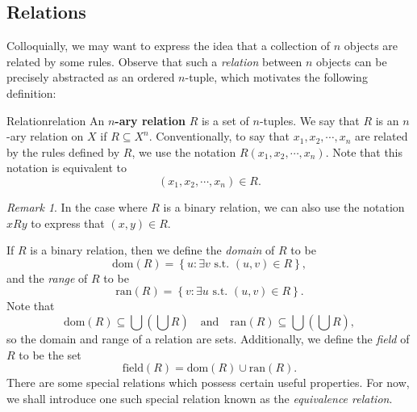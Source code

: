 \documentclass[math]{amznotes}
\theoremstyle{remark}
\newtheorem*{remark}{Remark}
\begin{document}
\subsection{Relations}
Colloquially, we may want to express the idea that a collection of $n$ objects are related by some rules. Observe that such a \textit{relation} between $n$ objects can be precisely abstracted as an ordered $n$-tuple, which motivates the following definition:
\begin{dfnbox}{Relation}{relation}
    An {\color{red} \textbf{$n$-ary relation}} $R$ is a set of $n$-tuples. We say that $R$ is an $n$-ary relation on $X$ if $R \subseteq X^n$. Conventionally, to say that $x_1, x_2, \cdots, x_n$ are related by the rules defined by $R$, we use the notation $R(x_1, x_2, \cdots, x_n)$. Note that this notation is equivalent to 
    \begin{displaymath}
        (x_1, x_2, \cdots, x_n) \in R.
    \end{displaymath}
\end{dfnbox}
\begin{notebox}
    \begin{remark}
        In the case where $R$ is a binary relation, we can also use the notation $xRy$ to express that $(x, y) \in R$.
    \end{remark}
\end{notebox}
If $R$ is a binary relation, then we define the \textit{domain} of $R$ to be
\begin{displaymath}
    \mathrm{dom}(R) = \left\{u \colon \exists v \textrm{ s.t. } (u, v) \in R\right\},
\end{displaymath}
and the \textit{range} of $R$ to be
\begin{displaymath}
    \mathrm{ran}(R) = \left\{v \colon \exists u \textrm{ s.t. } (u, v) \in R\right\}.
\end{displaymath}
Note that
\begin{displaymath}
    \mathrm{dom}(R) \subseteq \bigcup \left(\bigcup R\right) \quad \textrm{and} \quad \mathrm{ran}(R) \subseteq \bigcup \left(\bigcup R\right),
\end{displaymath}
so the domain and range of a relation are sets. Additionally, we define the \textit{field} of $R$ to be the set
\begin{displaymath}
    \mathrm{field}(R) = \mathrm{dom}(R) \cup \mathrm{ran}(R).
\end{displaymath}
There are some special relations which possess certain useful properties. For now, we shall introduce one such special relation known as the \textit{equivalence relation}.
\end{document}
